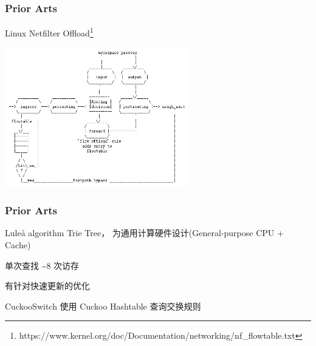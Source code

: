 \documentclass[UTF-8]{ctexbeamer}
\begin{document}
\begin{frame}
  \frametitle{Prior Arts}
  \begin{block}{Linux Netfilter Offload\footnote{https://www.kernel.org/doc/Documentation/networking/nf\_flowtable.txt}}
    \begin{center}
      \includegraphics[width=0.6\textwidth]{assets/nf.jpg}
    \end{center}
  \end{block}
\end{frame}
\begin{frame}
  \frametitle{Prior Arts}
  \begin{block}{Luleå algorithm}
    Trie Tree， 为通用计算硬件设计(General-purpose CPU + Cache)

    单次查找 \textasciitilde 8 次访存

    有针对快速更新的优化
  \end{block}
  \pause
  \begin{block}{CuckooSwitch}
    使用 Cuckoo Hashtable 查询交换规则
  \end{block}
\end{frame}
\end{document}

